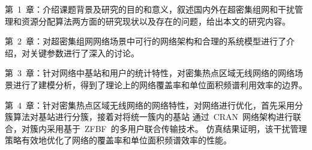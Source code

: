 第~1~章：介绍课题背景及研究的目的和意义，叙述国内外在超密集组网和干扰管理和资源分配算法两方面的研究现状以及存在的问题，给出本文的研究内容。

第~2~章：对超密集组网网络场景中可行的网络架构和合理的系统模型进行了介绍，对关键参数进行了深入的讨论。

第~3~章：针对网络中基站和用户的统计特性，对密集热点区域无线网络的网络场景进行了建模分析，得到了理论上的网络覆盖率和单位面积频谱利用效率的边界。

第~4~章：针对密集热点区域无线网络的网络特性，对网络进行优化，首先采用分簇算法对基站进行分簇，接着对将统一簇内的基站
通过~CRAN~网络架构进行联合，对簇内采用基于~ZFBF~的多用户联合传输技术。
仿真结果证明，该干扰管理策略有效地优化了网络的覆盖率和单位面积频谱效率的性能。
